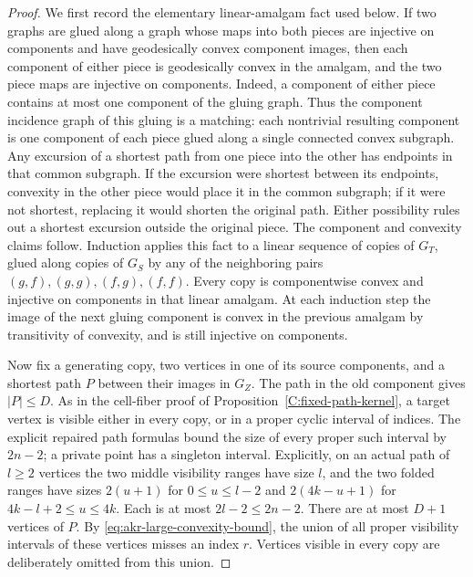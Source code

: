 \begin{proof}
We first record the elementary linear-amalgam fact used below.
If two graphs are glued along a graph whose maps into both pieces
are injective on components and have geodesically convex component
images, then each component of either piece is geodesically convex
in the amalgam, and the two piece maps are injective on components.
Indeed, a component of either piece contains at most one component
of the gluing graph. Thus the component incidence graph of this
gluing is a matching: each nontrivial resulting component is one
component of each piece glued along a single connected convex
subgraph. Any excursion of a shortest path from one piece into the
other has endpoints in that common subgraph. If the excursion were
shortest between its endpoints, convexity in the other piece would
place it in the common subgraph; if it were not shortest, replacing
it would shorten the original path. Either possibility rules out a
shortest excursion outside the original piece. The component and
convexity claims follow. Induction applies this fact to a linear
sequence of copies of $G_T$, glued along copies of $G_S$ by any of
the neighboring pairs $(g,f),(g,g),(f,g),(f,f)$. Every copy is
componentwise convex and injective on components in that linear
amalgam. At each induction step the image of the next gluing
component is convex in the previous amalgam by transitivity of
convexity, and is still injective on components.

Now fix a generating copy, two vertices in one of its source
components, and a shortest path $P$ between their images in $G_Z$.
The path in the old component gives $|P|\leq D$. As in the cell-fiber
proof of Proposition~\ref{C:fixed-path-kernel}, a target vertex is
visible either in every copy, or in a proper cyclic interval of
indices. The explicit repaired path formulas bound the size of
every proper such interval by $2n-2$; a private point has a singleton
interval. Explicitly, on an actual path of $l\geq2$ vertices the
two middle visibility ranges have size $l$, and the two folded
ranges have sizes $2(u+1)$ for $0\leq u\leq l-2$ and
$2(4k-u+1)$ for $4k-l+2\leq u\leq4k$. Each is at most
$2l-2\leq2n-2$. There are at most $D+1$ vertices of $P$. By
\eqref{eq:akr-large-convexity-bound}, the union of all proper
visibility intervals of these vertices misses an index $r$.
Vertices visible in every copy are deliberately omitted from this
union.


\end{proof}
